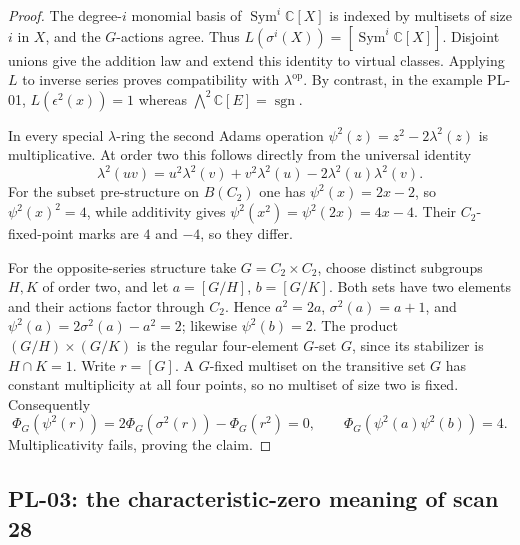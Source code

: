 \begin{proof}
The degree-$i$ monomial basis of $\operatorname{Sym}^i\mathbb C[X]$ is indexed
by multisets of size $i$ in $X$, and the $G$-actions agree. Thus
$L(\sigma^i(X))=[\operatorname{Sym}^i\mathbb C[X]]$.
Disjoint unions give the addition law and extend this identity to virtual
classes. Applying $L$ to inverse series proves compatibility with
$\lambda^{\mathrm{op}}$. By contrast, in the example PL-01,
$L(\epsilon^2(x))=1$ whereas $\bigwedge^2\mathbb C[E]=\operatorname{sgn}$.

In every special $\lambda$-ring the second Adams operation
$\psi^2(z)=z^2-2\lambda^2(z)$ is multiplicative. At order two this follows
directly from the universal identity
\[
 \lambda^2(uv)=u^2\lambda^2(v)+v^2\lambda^2(u)
                       -2\lambda^2(u)\lambda^2(v).
\]
For the subset pre-structure on $B(C_2)$ one has
$\psi^2(x)=2x-2$, so
$\psi^2(x)^2=4$, while additivity gives
$\psi^2(x^2)=\psi^2(2x)=4x-4$. Their $C_2$-fixed-point marks are
$4$ and $-4$, so they differ.

For the opposite-series structure take $G=C_2\times C_2$, choose distinct
subgroups $H,K$ of order two, and let $a=[G/H]$, $b=[G/K]$.
Both sets have two elements and their actions factor through $C_2$. Hence
$a^2=2a$, $\sigma^2(a)=a+1$, and
$\psi^2(a)=2\sigma^2(a)-a^2=2$; likewise $\psi^2(b)=2$.
The product $(G/H)\times(G/K)$ is the regular four-element $G$-set $G$,
since its stabilizer is $H\cap K=1$. Write $r=[G]$. A $G$-fixed multiset on
the transitive set $G$ has constant multiplicity at all four points, so no
multiset of size two is fixed. Consequently
\[
 \Phi_G(\psi^2(r))=
  2\Phi_G(\sigma^2(r))-\Phi_G(r^2)=0,
 \qquad
 \Phi_G(\psi^2(a)\psi^2(b))=4.
\]
Multiplicativity fails, proving the claim.
\end{proof}

\subsection{PL-03: the characteristic-zero meaning of scan 28}
